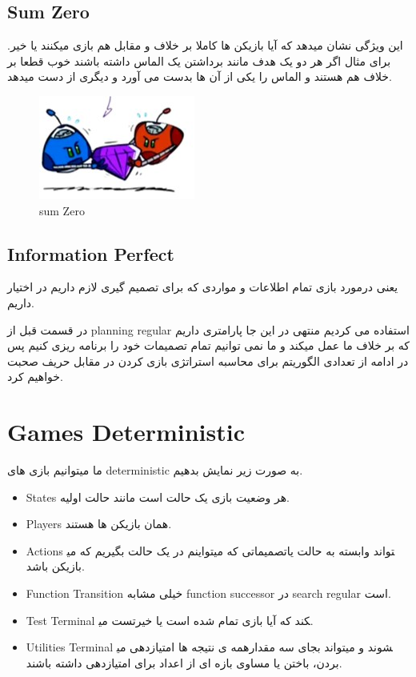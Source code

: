 \subsection{Sum Zero}
این ویژگی نشان میدهد که آیا بازیکن ها کاملا بر خلاف و مقابل هم بازی میکنند یا خیر. برای مثال اگر هر دو یک هدف مانند برداشتن یک الماس داشته باشند خوب قطعا بر خلاف هم هستند و الماس را یکی از آن ها بدست می آورد و دیگری از دست میدهد.

\begin{figure}[h!]
    \centering
    \includegraphics[width=0.3\linewidth]{images/zerosum.jpg}
    \caption{sum Zero}
\end{figure}


\subsection{Information Perfect}
یعنی درمورد بازی تمام اطلاعات و مواردی که برای تصمیم گیری لازم داریم در اختیار داریم.


در قسمت قبل از planning regular استفاده می کردیم منتهی در این جا پارامتری داریم که بر خلاف ما عمل میکند و ما نمی توانیم تمام تصمیمات خود را برنامه ریزی کنیم پس در ادامه از تعدادی الگوریتم برای محاسبه استراتژی بازی کردن در مقابل حریف صحبت خواهیم کرد.



\section{Games Deterministic}
ما میتوانیم بازی های deterministic به صورت زیر نمایش بدهیم.
\begin{itemize}
    \item
States هر وضعیت بازی یک حالت است مانند حالت اولیه.
    \item
Players همان بازیکن ها هستند.
    \item
Actions تصمیماتی که میتواینم در یک حالت بگیریم که می‎تواند وابسته به حالت یا بازیکن باشد. 
    \item
Function Transition خیلی مشابه function successor در search regular است.
    \item
Test Terminal تست می‎کند که آیا بازی تمام شده است یا خیر.
    \item
 Utilities Terminal همه ی نتیجه ها امتیازدهی می‎شوند و میتواند بجای سه مقدار بردن، باختن یا مساوی بازه ای از اعداد برای امتیازدهی داشته باشند.
 \end{itemize}



